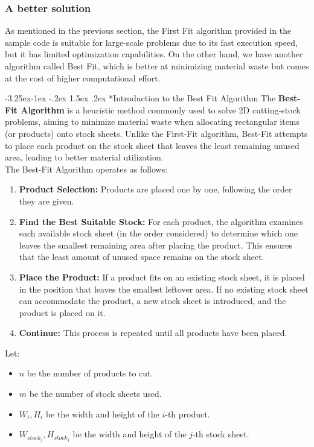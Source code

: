 \documentclass[a4paper]{article}
\makeatletter
\newcounter {subsubsubsection}[subsubsection]
\newcommand\subsubsubsection{\@startsection{subsubsubsection}{4}{\z@}%
                                         {-3.25ex\@plus -1ex \@minus -.2ex}%
                                         {1.5ex \@plus .2ex}%
                                         {\normalfont\normalsize\bfseries}}
\makeatother
\begin{document}
    \subsubsection{A better solution}
    As mentioned in the previous section, the First Fit algorithm provided in the sample code is suitable for large-scale problems due to its fast execution speed, but it has limited optimization capabilities. On the other hand, we have another algorithm called Best Fit, which is better at minimizing material waste but comes at the cost of higher computational effort.
    
    \subsubsubsection*{Introduction to the Best Fit Algorithm}
    The \textbf{Best-Fit Algorithm} is a heuristic method commonly used to solve 2D cutting-stock problems, aiming to minimize material waste when allocating rectangular items (or products) onto stock sheets. Unlike the First-Fit algorithm, Best-Fit attempts to place each product on the stock sheet that leaves the least remaining unused area, leading to better material utilization.
    \vspace{0.2cm}\\
    The Best-Fit Algorithm operates as follows:
    \begin{enumerate}
        \item \textbf{Product Selection:} Products are placed one by one, following the order they are given.
        \item \textbf{Find the Best Suitable Stock:} For each product, the algorithm examines each available stock sheet (in the order considered) to determine which one leaves the smallest remaining area after placing the product. This ensures that the least amount of unused space remains on the stock sheet.
        \item \textbf{Place the Product:} If a product fits on an existing stock sheet, it is placed in the position that leaves the smallest leftover area. If no existing stock sheet can accommodate the product, a new stock sheet is introduced, and the product is placed on it.
        \item \textbf{Continue:} This process is repeated until all products have been placed.
    \end{enumerate}
    \vspace{0.2cm}
    Let:
    \begin{itemize}
        \item $n$ be the number of products to cut.
        \item $m$ be the number of stock sheets used.
        \item $W_i, H_i$ be the width and height of the $i$-th product.
        \item $W_{stock_j}, H_{stock_j}$ be the width and height of the $j$-th stock sheet.
    \end{itemize}
\end{document}
